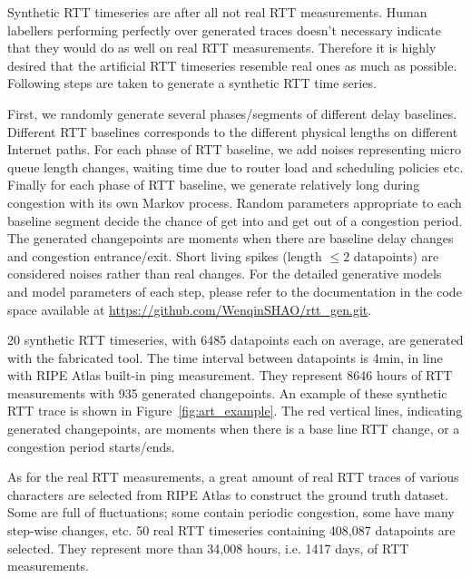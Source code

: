 Synthetic RTT timeseries are after all not real RTT measurements.
Human labellers performing perfectly over generated traces doesn't necessary indicate that they would do as well on real RTT measurements.
Therefore it is highly desired that the artificial RTT timeseries resemble real ones as much as possible.
Following steps are taken to generate a synthetic RTT time series.

First, we randomly generate several phases/segments of different delay baselines.
Different RTT baselines corresponds to the different physical lengths on different Internet paths.
For each phase of RTT baseline, we add noises representing micro queue length changes, waiting time due to router load and scheduling policies etc.
Finally for each phase of RTT baseline, we generate relatively long during congestion with its own Markov process.
Random parameters appropriate to each baseline segment decide the chance of get into and get out of a congestion period.
The generated changepoints are moments when there are baseline delay changes and congestion entrance/exit.
Short living spikes (length $\leq 2$ datapoints) are considered noises rather than real changes.
For the detailed generative models and model parameters of each step, please refer to the documentation in the code space available at \url{https://github.com/WenqinSHAO/rtt_gen.git}.

20 synthetic RTT timeseries, with 6485 datapoints each on average, are generated with the fabricated tool.
The time interval between datapoints is 4min, in line with RIPE Atlas built-in ping measurement.
They represent 8646 hours of RTT measurements with 935 generated changepoints.
An example of these synthetic RTT trace is shown in Figure~\ref{fig:art_example}.
The red vertical lines, indicating generated changepoints, are moments when there is a base line RTT change, or a congestion period starts/ends.

As for the real RTT measurements, a great amount of real RTT traces of various characters are selected from RIPE Atlas to construct the ground truth dataset.
Some are full of fluctuations; some contain periodic congestion, some have many step-wise changes, etc.
50 real RTT timeseries containing 408,087 datapoints are selected.
They represent more than 34,008 hours, i.e. 1417 days, of RTT measurements. 


